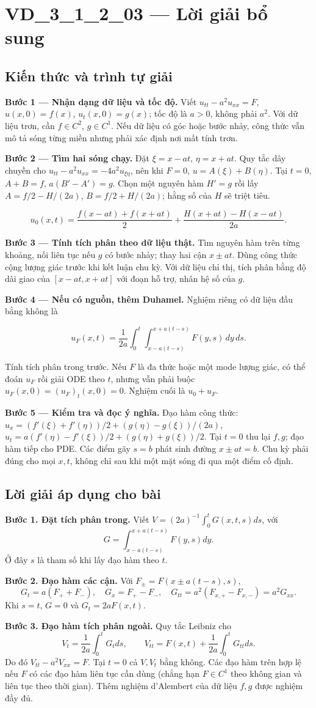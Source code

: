 \documentclass[10pt,a4paper]{article}
\begin{document}
\section*{VD\_3\_1\_2\_03 — Lời giải bổ sung}
\subsection*{Kiến thức và trình tự giải}
\textbf{Bước 1 — Nhận dạng dữ liệu và tốc độ.} Viết $u_{tt}-a^2u_{xx}=F$, $u(x,0)=f(x)$, $u_t(x,0)=g(x)$; tốc độ là $a>0$, không phải $a^2$. Với dữ liệu trơn, cần $f\in C^2$, $g\in C^1$. Nếu dữ liệu có góc hoặc bước nhảy, công thức vẫn mô tả sóng từng miền nhưng phải xác định nơi mất tính trơn.

\textbf{Bước 2 — Tìm hai sóng chạy.} Đặt $\xi=x-at$, $\eta=x+at$. Quy tắc dây chuyền cho $u_{tt}-a^2u_{xx}=-4a^2u_{\xi\eta}$, nên khi $F=0$, $u=A(\xi)+B(\eta)$. Tại $t=0$, $A+B=f$, $a(B'-A')=g$. Chọn một nguyên hàm $H'=g$ rồi lấy $A=f/2-H/(2a)$, $B=f/2+H/(2a)$; hằng số của $H$ sẽ triệt tiêu.


\[
u_0(x,t)=\frac{f(x-at)+f(x+at)}2+\frac{H(x+at)-H(x-at)}{2a}.
\]


\textbf{Bước 3 — Tính tích phân theo dữ liệu thật.} Tìm nguyên hàm trên từng khoảng, nối liên tục nếu $g$ có bước nhảy; thay hai cận $x\pm at$. Dùng công thức cộng lượng giác trước khi kết luận chu kỳ. Với dữ liệu chỉ thị, tích phân bằng độ dài giao của $[x-at,x+at]$ với đoạn hỗ trợ, nhân hệ số của $g$.

\textbf{Bước 4 — Nếu có nguồn, thêm Duhamel.} Nghiệm riêng có dữ liệu đầu bằng không là


\[
u_F(x,t)=\frac1{2a}\int_0^t\int_{x-a(t-s)}^{x+a(t-s)}F(y,s)\,dy\,ds.
\]


Tính tích phân trong trước. Nếu $F$ là đa thức hoặc một mode lượng giác, có thể đoán $u_F$ rồi giải ODE theo $t$, nhưng vẫn phải buộc $u_F(x,0)=(u_F)_t(x,0)=0$. Nghiệm cuối là $u_0+u_F$.

\textbf{Bước 5 — Kiểm tra và đọc ý nghĩa.} Đạo hàm công thức: $u_x=(f'(\xi)+f'(\eta))/2+(g(\eta)-g(\xi))/(2a)$, $u_t=a(f'(\eta)-f'(\xi))/2+(g(\eta)+g(\xi))/2$. Tại $t=0$ thu lại $f,g$; đạo hàm tiếp cho PDE. Các điểm gãy $s=b$ phát sinh đường $x\pm at=b$. Chu kỳ phải đúng cho mọi $x,t$, không chỉ sau khi một mặt sóng đi qua một điểm cố định.
\subsection*{Lời giải áp dụng cho bài}
\textbf{Bước 1. Đặt tích phân trong.} Viết $V=(2a)^{-1}\int_0^t G(x,t,s)ds$, với
\[G=\int_{x-a(t-s)}^{x+a(t-s)}F(y,s)dy.\]
Ở đây $s$ là tham số khi lấy đạo hàm theo $t$.

\textbf{Bước 2. Đạo hàm các cận.} Với $F_\pm=F(x\pm a(t-s),s)$,
\[G_t=a(F_++F_-),\quad G_x=F_+-F_-,\quad G_{tt}=a^2(F_{x,+}-F_{x,-})=a^2G_{xx}.\]
Khi $s=t$, $G=0$ và $G_t=2aF(x,t)$.

\textbf{Bước 3. Đạo hàm tích phân ngoài.} Quy tắc Leibniz cho
\[V_t=\frac1{2a}\int_0^tG_tds,\qquad V_{tt}=F(x,t)+\frac1{2a}\int_0^tG_{tt}ds.\]
Do đó $V_{tt}-a^2V_{xx}=F$. Tại $t=0$ cả $V,V_t$ bằng không. Các đạo hàm trên hợp lệ nếu $F$ có các đạo hàm liên tục cần dùng (chẳng hạn $F\in C^1$ theo không gian và liên tục theo thời gian). Thêm nghiệm d'Alembert của dữ liệu $f,g$ được nghiệm đầy đủ.
\end{document}
